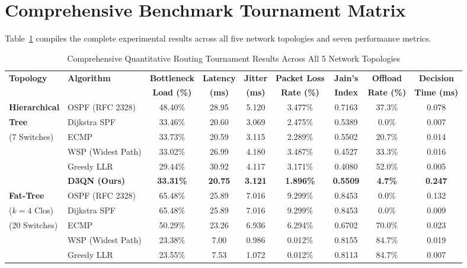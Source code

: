 \documentclass[12pt,a4paper,oneside]{report}
\begin{document}
\section{Comprehensive Benchmark Tournament Matrix}
Table~\ref{tab:full_tournament_matrix_ch7} compiles the complete experimental results across all five network topologies and seven performance metrics.

\begin{table}[htbp]
\centering
\caption{Comprehensive Quantitative Routing Tournament Results Across All 5 Network Topologies}
\label{tab:full_tournament_matrix_ch7}
\scriptsize
\begin{tabularx}{\textwidth}{l l c c c c c c c}
\toprule
\textbf{Topology} & \textbf{Algorithm} & \textbf{Bottleneck} & \textbf{Latency} & \textbf{Jitter} & \textbf{Packet Loss} & \textbf{Jain's} & \textbf{Offload} & \textbf{Decision} \\
& & \textbf{Load (\%)} & \textbf{(ms)} & \textbf{(ms)} & \textbf{Rate (\%)} & \textbf{Index} & \textbf{Rate (\%)} & \textbf{Time (ms)} \\
\midrule
\textbf{Hierarchical} & OSPF (RFC 2328) & 48.40\% & 28.95 & 5.120 & 3.477\% & 0.7163 & 37.3\% & 0.078 \\
\textbf{Tree} & Dijkstra SPF & 33.46\% & 20.60 & 3.069 & 2.475\% & 0.5389 & 0.0\% & 0.007 \\
(7 Switches) & ECMP & 33.73\% & 20.59 & 3.115 & 2.289\% & 0.5502 & 20.7\% & 0.014 \\
& WSP (Widest Path) & 33.02\% & 26.99 & 4.180 & 3.487\% & 0.4527 & 33.3\% & 0.016 \\
& Greedy LLR & 29.44\% & 30.92 & 4.117 & 3.171\% & 0.4080 & 52.0\% & 0.005 \\
& \textbf{D3QN (Ours)} & \textbf{33.31\%} & \textbf{20.75} & \textbf{3.121} & \textbf{1.896\%} & \textbf{0.5509} & \textbf{4.7\%} & \textbf{0.247} \\
\midrule
\textbf{Fat-Tree} & OSPF (RFC 2328) & 65.48\% & 25.89 & 7.016 & 9.299\% & 0.8453 & 0.0\% & 0.132 \\
($k=4$ Clos) & Dijkstra SPF & 65.48\% & 25.89 & 7.016 & 9.299\% & 0.8453 & 0.0\% & 0.009 \\
(20 Switches) & ECMP & 50.29\% & 23.26 & 6.936 & 6.294\% & 0.6702 & 70.0\% & 0.023 \\
& WSP (Widest Path) & 23.38\% & 7.00 & 0.986 & 0.012\% & 0.8155 & 84.7\% & 0.019 \\
& Greedy LLR & 23.55\% & 7.53 & 1.072 & 0.012\% & 0.8113 & 84.7\% & 0.007 \\

\end{tabularx}
\end{table}
\end{document}
